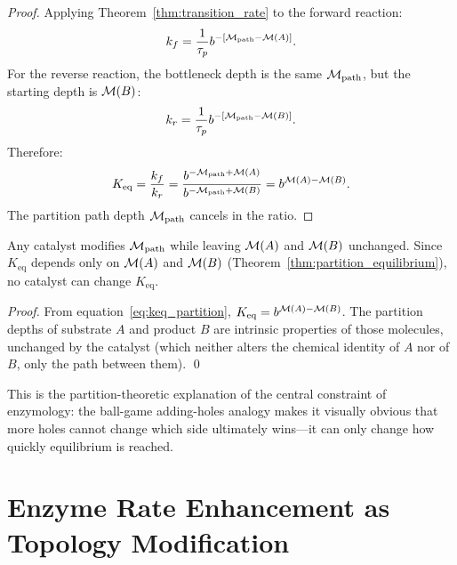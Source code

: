 \begin{proof}
Applying Theorem~\ref{thm:transition_rate} to the forward reaction:
\begin{equation}
  k_f = \frac{1}{\tau_p} b^{-[\mathcal{M}_{\mathrm{path}} - \mathcal{M}(A)]}.
\end{equation}
For the reverse reaction, the bottleneck depth is the same $\mathcal{M}_{\mathrm{path}}$,
but the starting depth is $\mathcal{M}(B)$:
\begin{equation}
  k_r = \frac{1}{\tau_p} b^{-[\mathcal{M}_{\mathrm{path}} - \mathcal{M}(B)]}.
\end{equation}
Therefore:
\begin{equation}
  K_{\mathrm{eq}} = \frac{k_f}{k_r}
    = \frac{b^{-\mathcal{M}_{\mathrm{path}} + \mathcal{M}(A)}}{b^{-\mathcal{M}_{\mathrm{path}} + \mathcal{M}(B)}}
    = b^{\mathcal{M}(A) - \mathcal{M}(B)}.
\end{equation}
The partition path depth $\mathcal{M}_{\mathrm{path}}$ cancels in the ratio.
\end{proof}

\begin{corollary}
\label{cor:catalyst_keq}
Any catalyst modifies $\mathcal{M}_{\mathrm{path}}$ while leaving $\mathcal{M}(A)$
and $\mathcal{M}(B)$ unchanged. Since $K_{\mathrm{eq}}$ depends only on $\mathcal{M}(A)$
and $\mathcal{M}(B)$ (Theorem~\ref{thm:partition_equilibrium}), no catalyst can
change $K_{\mathrm{eq}}$.
\end{corollary}

\begin{proof}
From equation~\eqref{eq:keq_partition}, $K_{\mathrm{eq}} = b^{\mathcal{M}(A) - \mathcal{M}(B)}$.
The partition depths of substrate $A$ and product $B$ are intrinsic properties
of those molecules, unchanged by the catalyst (which neither alters the chemical
identity of $A$ nor of $B$, only the path between them). \qed
\end{proof}

This is the partition-theoretic explanation of the central constraint of
enzymology: the ball-game adding-holes analogy makes it visually obvious that
more holes cannot change which side ultimately wins---it can only change how
quickly equilibrium is reached.

\section{Enzyme Rate Enhancement as Topology Modification}
\label{sec:enzyme_topology}

